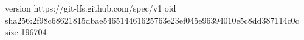 version https://git-lfs.github.com/spec/v1
oid sha256:2f98c68621815dbae546514461625763e23ef045e96394010e5c8dd387114c0c
size 196704
